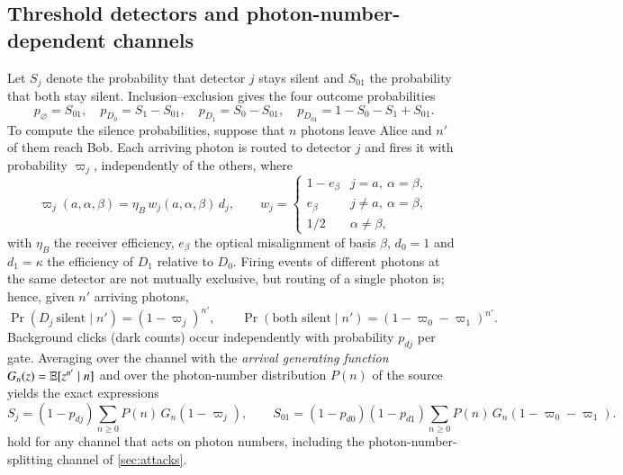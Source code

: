 \subsection{Threshold detectors and photon-number-dependent channels}\label{sec:threshold}

Let $S_j$ denote the probability that detector $j$ stays silent and $S_{01}$ the probability that both stay silent. Inclusion--exclusion gives the four outcome probabilities
\begin{equation}
p_{\varnothing}=S_{01},\quad p_{D_0}=S_1-S_{01},\quad p_{D_1}=S_0-S_{01},\quad p_{D_{01}}=1-S_0-S_1+S_{01}. \label{eq:outcomes}
\end{equation}
To compute the silence probabilities, suppose that $n$ photons leave Alice and $n'$ of them reach Bob. Each arriving photon is routed to detector $j$ and fires it with probability $\varpi_j$, independently of the others, where
\begin{equation}
\varpi_j(a,\alpha,\beta) = \eta_B\, w_j(a,\alpha,\beta)\, d_j,\qquad
w_j = \begin{cases} 1-e_\beta & j=a,\ \alpha=\beta,\\ e_\beta & j\neq a,\ \alpha=\beta,\\ 1/2 & \alpha\neq\beta,\end{cases} \label{eq:routing}
\end{equation}
with $\eta_B$ the receiver efficiency, $e_\beta$ the optical misalignment of basis $\beta$, $d_0=1$ and $d_1=\kappa$ the efficiency of $D_1$ relative to $D_0$. Firing events of different photons at the same detector are not mutually exclusive, but routing of a single photon is; hence, given $n'$ arriving photons,
\begin{equation}
\Pr(D_j\ \text{silent}\mid n') = (1-\varpi_j)^{n'},\qquad \Pr(\text{both silent}\mid n') = (1-\varpi_0-\varpi_1)^{n'}.
\end{equation}
Background clicks (dark counts) occur independently with probability $p_{dj}$ per gate. Averaging over the channel with the \emph{arrival generating function} $G_n(z)=\mathbb{E}[z^{n'}\mid n]$ and over the photon-number distribution $P(n)$ of the source yields the exact expressions
\begin{equation}
S_j = (1-p_{dj})\sum_{n\ge0}P(n)\,G_n(1-\varpi_j),\qquad
S_{01} = (1-p_{d0})(1-p_{d1})\sum_{n\ge0}P(n)\,G_n(1-\varpi_0-\varpi_1). \label{eq:silence}
\end{equation}
 hold for any channel that acts on photon numbers, including the photon-number-splitting channel of \cref{sec:attacks}.

